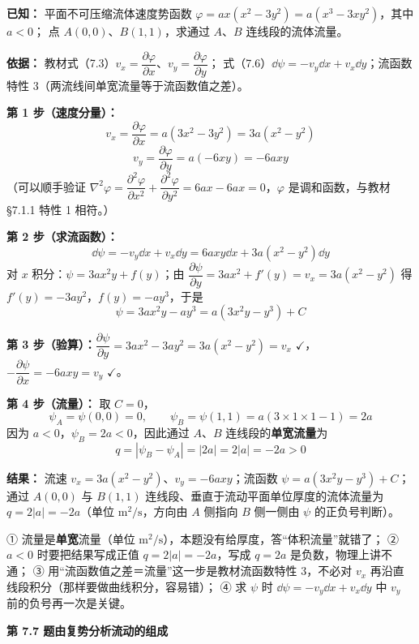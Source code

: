 \begin{jie}
\textbf{已知：} 平面不可压缩流体速度势函数 $\varphi=ax(x^2-3y^2)=a(x^3-3xy^2)$，其中 $a<0$；
点 $A(0,0)$、$B(1,1)$，求通过 $A$、$B$ 连线段的流体流量。

\textbf{依据：} 教材式（7.3）$v_x=\dfrac{\partial\varphi}{\partial x}$、$v_y=\dfrac{\partial\varphi}{\partial y}$；
式（7.6）$\dd\psi=-v_y\dd x+v_x\dd y$；流函数特性 3（两流线间单宽流量等于流函数值之差）。

\textbf{第 1 步（速度分量）：}
\[
v_x=\frac{\partial\varphi}{\partial x}=a(3x^2-3y^2)=3a(x^2-y^2)
\]
\[
v_y=\frac{\partial\varphi}{\partial y}=a(-6xy)=-6axy
\]
（可以顺手验证 $\nabla^2\varphi=\dfrac{\partial^2\varphi}{\partial x^2}+\dfrac{\partial^2\varphi}{\partial y^2}=6ax-6ax=0$，$\varphi$ 是调和函数，与教材 \S7.1.1 特性 1 相符。）

\textbf{第 2 步（求流函数）：}
\[
\dd\psi=-v_y\dd x+v_x\dd y=6axy\dd x+3a(x^2-y^2)\dd y
\]
对 $x$ 积分：$\psi=3ax^2y+f(y)$；由
$\dfrac{\partial\psi}{\partial y}=3ax^2+f'(y)=v_x=3a(x^2-y^2)$ 得 $f'(y)=-3ay^2$，$f(y)=-ay^3$，于是
\[
\psi=3ax^2y-ay^3=a(3x^2y-y^3)+C
\]

\textbf{第 3 步（验算）：}$\dfrac{\partial\psi}{\partial y}=3ax^2-3ay^2=3a(x^2-y^2)=v_x$ $\checkmark$，
$-\dfrac{\partial\psi}{\partial x}=-6axy=v_y$ $\checkmark$。

\textbf{第 4 步（流量）：} 取 $C=0$，
\[
\psi_A=\psi(0,0)=0,\qquad \psi_B=\psi(1,1)=a(3\times 1\times 1-1)=2a
\]
因为 $a<0$，$\psi_B=2a<0$，因此通过 $A$、$B$ 连线段的\textbf{单宽流量}为
\[
q=|\psi_B-\psi_A|=|2a|=2|a|=-2a>0
\]

\textbf{结果：} 流速 $v_x=3a(x^2-y^2)$、$v_y=-6axy$；流函数 $\psi=a(3x^2y-y^3)+C$；
通过 $A(0,0)$ 与 $B(1,1)$ 连线段、垂直于流动平面单位厚度的流体流量为 $q=2|a|=-2a$（单位 $\mathrm{m^2/s}$，方向由 $A$ 侧指向 $B$ 侧一侧由 $\psi$ 的正负号判断）。
\end{jie}

\begin{yicuo}
① 流量是\textbf{单宽}流量（单位 $\mathrm{m^2/s}$），本题没有给厚度，答“体积流量”就错了；
② $a<0$ 时要把结果写成正值 $q=2|a|=-2a$，写成 $q=2a$ 是负数，物理上讲不通；
③ 用“流函数值之差＝流量”这一步是教材流函数特性 3，不必对 $v_x$ 再沿直线段积分（那样要做曲线积分，容易错）；
④ 求 $\psi$ 时 $\dd\psi=-v_y\dd x+v_x\dd y$ 中 $v_y$ 前的负号再一次是关键。
\end{yicuo}

\noindent\textbf{第 7.7 题\quad 由复势分析流动的组成}

